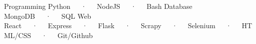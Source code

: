 

\begin{cvtechnicals}
  \cvtechnical %
    {Programming} %
    {Python~~~·~~~NodeJS~~~·~~~Bash} %
    {Database} %
    {MongoDB~~~·~~~SQL} %
    {Web} %
    {React~~~·~~~Express~~~·~~~Flask~~~·~~~Scrapy~~~·~~~Selenium~~~·~~~HTML/CSS~~~·~~~Git/Github} %
\end{cvtechnicals}